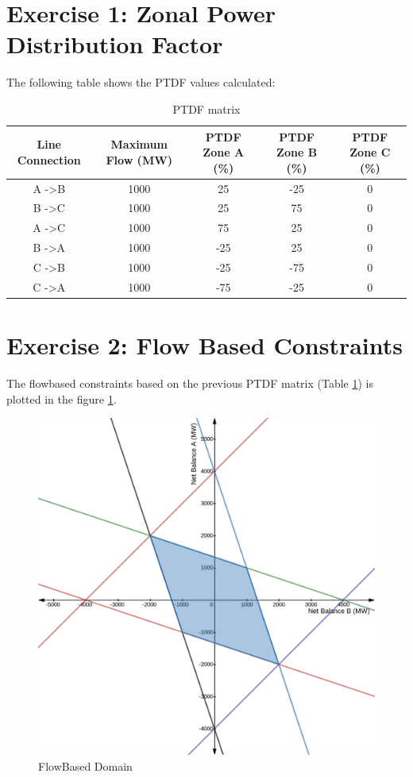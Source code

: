\justifying

\section*{\textbf{Exercise 1: Zonal Power Distribution Factor}}
The following table shows the PTDF values calculated:
\begin{table}[H]
\centering
\begin{tabular}{|c|c|c|c|c|}
\hline
Line Connection   & Maximum Flow (MW) & PTDF Zone A (\%) & PTDF Zone B (\%) & PTDF Zone C (\%) \\ \hline
A -\textgreater B & 1000              & 25               & -25              & 0                \\ \hline
B -\textgreater C & 1000              & 25               & 75               & 0                \\ \hline
A -\textgreater C & 1000              & 75               & 25               & 0                \\ \hline
B -\textgreater A & 1000              & -25              & 25               & 0                \\ \hline
C -\textgreater B & 1000              & -25              & -75              & 0                \\ \hline
C -\textgreater A & 1000              & -75              & -25              & 0                \\ \hline
\end{tabular}
\caption{PTDF matrix}
\label{table:PTDF_matrix}
\end{table}

\section*{\textbf{Exercise 2: Flow Based Constraints}}

The flowbased constraints based on the previous PTDF matrix (Table \ref{table:PTDF_matrix}) is plotted in the figure \ref{fig:PTDF}.

\begin{figure}[H]
    \centering
        \includegraphics[width=0.6 \linewidth]{PTDF.png}
        \caption{FlowBased Domain}
        \label{fig:PTDF}
\end{figure}

